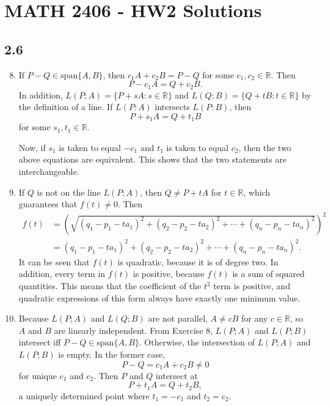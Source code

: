 \documentclass[a4paper,12pt]{article}
\begin{document}
\section*{MATH 2406 - HW2 Solutions}

\subsection*{2.6}

\begin{enumerate}

\setcounter{enumi}{7}
\item If $P - Q \in \mbox{span}\{A, B\}$, then $c_1A + c_2B = P - Q$ for some $c_1, c_2 \in \mathbb{R}$. Then
\[ P - c_1A = Q + c_2B. \]
In addition, $L(P;A) = \{P + sA : s \in \mathbb{R}\}$ and $L(Q;B) = \{Q + tB : t \in \mathbb{R}\}$ by the definition of a line. If $L(P:A)$ intersects $L(P:B)$, then
\[ P + s_1A = Q + t_1B\]
for some $s_1, t_1 \in \mathbb{R}$. \par
Now, if $s_1$ is taken to equal $-c_1$ and $t_1$ is taken to equal $c_2$, then the two above equations are equivalent. This shows that the two statements are interchangeable.

\setcounter{enumi}{9}
\item If $Q$ is not on the line $L(P;A)$, then $Q \not= P + tA$ for $t \in \mathbb{R}$, which guarantees that $f(t) \not= 0$. Then
\begin{align*}
f(t) &= \left(\sqrt{(q_1 - p_1 - ta_1)^2 + (q_2 - p_2 - ta_2)^2 + \cdots + (q_n - p_n - ta_n)^2}\right)^2 \\
&= (q_1 - p_1 - ta_1)^2 + (q_2 - p_2 - ta_2)^2 + \cdots + (q_n - p_n - ta_n)^2.
\end{align*}
It can be seen that $f(t)$ is quadratic, because it is of degree two. In addition, every term in $f(t)$ is positive, because $f(t)$ is a sum of squared quantities. This means that the coefficient of the $t^2$ term is positive, and quadratic expressions of this form always have exactly one minimum value.

\setcounter{enumi}{11}
\item Because $L(P;A)$ and $L(Q;B)$ are not parallel, $A \not= cB$ for any $c \in \mathbb{R}$, so $A$ and $B$ are linearly independent. From Exercise 8, $L(P;A)$ and $L(P;B)$ intersect iff $P - Q \in \mbox{span}\{A, B\}$. Otherwise, the intersection of $L(P;A)$ and $L(P;B)$ is empty. In the former case,
\[ P - Q = c_1A + c_2B \not= 0 \]
for unique $c_1$ and $c_2$. Then $P$ and $Q$ intersect at
\[ P + t_1A = Q + t_2B, \]
a uniquely determined point where $t_1 = -c_1$ and $t_2 = c_2$.

\end{enumerate}
\end{document}

